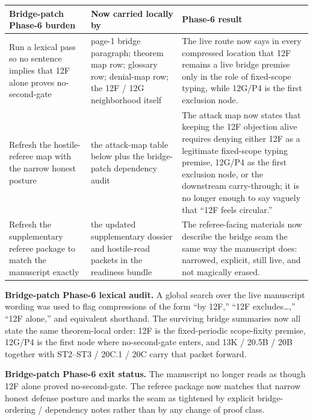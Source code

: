 \begin{center}
\footnotesize
\renewcommand{\arraystretch}{1.16}
\setlength{\tabcolsep}{4pt}
\begin{tabularx}{0.98\textwidth}{@{}L{0.29\textwidth}L{0.25\textwidth}Y@{}}
\toprule
\textbf{Bridge-patch Phase-6 burden} & \textbf{Now carried locally by} & \textbf{Phase-6 result}\\
\midrule
Run a lexical pass so no sentence implies that 12F alone proves no-second-gate & page-1 bridge paragraph; theorem map row; glossary row; denial-map row; the 12F / 12G neighborhood itself & The live route now says in every compressed location that 12F remains a live bridge premise only in the role of fixed-scope typing, while 12G/P4 is the first exclusion node.\\
Refresh the hostile-referee map with the narrow honest posture & the attack-map table below plus the bridge-patch dependency audit & The attack map now states that keeping the 12F objection alive requires denying either 12F as a legitimate fixed-scope typing premise, 12G/P4 as the first exclusion node, or the downstream carry-through; it is no longer enough to say vaguely that ``12F feels circular.''\\
Refresh the supplementary referee package to match the manuscript exactly & the updated supplementary dossier and hostile-read packets in the readiness bundle & The referee-facing materials now describe the bridge seam the same way the manuscript does: narrowed, explicit, still live, and not magically erased.\\
\bottomrule
\end{tabularx}
\end{center}

\noindent\textbf{Bridge-patch Phase-6 lexical audit.} A global search over the live manuscript wording was used to flag compressions of the form ``by 12F,'' ``12F excludes\ldots,'' ``12F alone,'' and equivalent shorthand. The surviving bridge summaries now all state the same theorem-local order: 12F is the fixed-periodic scope-fixity premise, 12G/P4 is the first node where no-second-gate enters, and 13K / 20.5B / 20B together with ST2--ST3 / 20C.1 / 20C carry that packet forward.

\noindent\textbf{Bridge-patch Phase-6 exit status.} The manuscript no longer reads as though 12F alone proved no-second-gate. The referee package now matches that narrow honest defense posture and marks the seam as tightened by explicit bridge-ordering / dependency notes rather than by any change of proof class.


